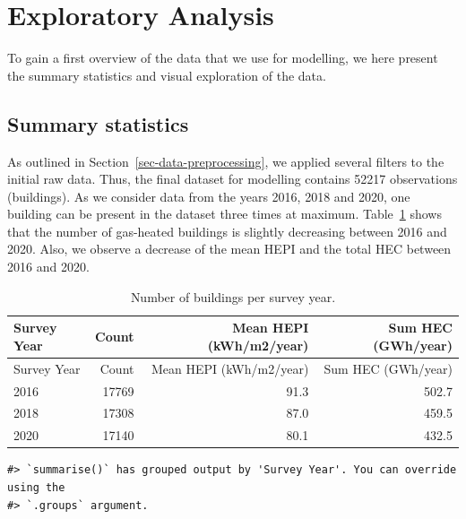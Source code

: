 \documentclass[
  letterpaper,
  DIV=11,
  numbers=noendperiod]{scrreprt}
\begin{document}
\hypertarget{sec-exploratory-analysis}{%
\section{Exploratory Analysis}\label{sec-exploratory-analysis}}

To gain a first overview of the data that we use for modelling, we here
present the summary statistics and visual exploration of the data.

\hypertarget{summary-statistics}{%
\subsection{Summary statistics}\label{summary-statistics}}

As outlined in Section~\ref{sec-data-preprocessing}, we applied several
filters to the initial raw data. Thus, the final dataset for modelling
contains 52217 observations (buildings). As we consider data from the
years 2016, 2018 and 2020, one building can be present in the dataset
three times at maximum. Table~\ref{tbl-obs-per-year} shows that the
number of gas-heated buildings is slightly decreasing between 2016 and
2020. Also, we observe a decrease of the mean HEPI and the total HEC
between 2016 and 2020.

\hypertarget{tbl-obs-per-year}{}
\begin{longtable}[]{@{}lrrr@{}}
\caption{\label{tbl-obs-per-year}Number of buildings per survey
year.}\tabularnewline
\toprule()
Survey Year & Count & Mean HEPI (kWh/m2/year) & Sum HEC (GWh/year) \\
\midrule()
\endfirsthead
\toprule()
Survey Year & Count & Mean HEPI (kWh/m2/year) & Sum HEC (GWh/year) \\
\midrule()
\endhead
2016 & 17769 & 91.3 & 502.7 \\
2018 & 17308 & 87.0 & 459.5 \\
2020 & 17140 & 80.1 & 432.5 \\
\bottomrule()
\end{longtable}

\begin{verbatim}
#> `summarise()` has grouped output by 'Survey Year'. You can override using the
#> `.groups` argument.
\end{verbatim}
\end{document}

